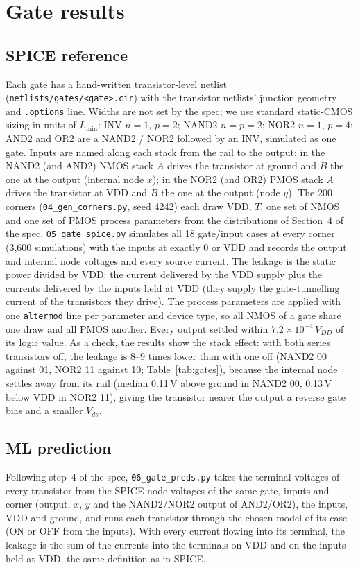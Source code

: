 \documentclass[11pt,a4paper]{article}
\begin{document}
\section{Gate results}\label{sec:gates}
\subsection{SPICE reference}
Each gate has a hand-written transistor-level netlist (\texttt{netlists/gates/<gate>.cir}) with the
transistor netlists' junction geometry and \texttt{.options} line. Widths are not set by the spec;
we use standard static-CMOS sizing in units of $L_{\min}$: INV $n=1$, $p=2$; NAND2 $n=p=2$; NOR2 $n=1$,
$p=4$; AND2 and OR2 are a NAND2 / NOR2 followed by an INV, simulated as one gate. Inputs are named
along each stack from the rail to the output: in the NAND2 (and AND2) NMOS stack $A$ drives the
transistor at ground and $B$ the one at the output (internal node $x$); in the NOR2 (and OR2) PMOS
stack $A$ drives the transistor at VDD and $B$ the one at the output (node $y$).
The 200 corners (\texttt{04\_gen\_corners.py}, seed 4242) each draw VDD, $T$, one set of NMOS and one
set of PMOS process parameters from the distributions of Section~4 of the spec. \texttt{05\_gate\_spice.py}
simulates all 18 gate/input cases at every corner (3{,}600 simulations) with the inputs at exactly 0 or
VDD and records the output and internal node voltages and every source current. The leakage is the
static power divided by VDD: the current delivered by the VDD supply plus the currents delivered by the
inputs held at VDD (they supply the gate-tunnelling current of the transistors they drive). The process
parameters are applied with one \texttt{altermod} line per parameter and device type, so all NMOS of a gate
share one draw and all PMOS another. Every output settled within $7.2\times10^{-4}\,V_{DD}$ of its logic
value. As a check, the results show the stack effect: with both series transistors off, the leakage is
8--9 times lower than with one off (NAND2 00 against 01, NOR2 11 against 10; Table~\ref{tab:gates}),
because the internal node settles away from its rail (median 0.11\,V above ground in NAND2 00, 0.13\,V
below VDD in NOR2 11), giving the transistor nearer the output a reverse gate bias and a smaller $V_{ds}$.

\subsection{ML prediction}
Following step~4 of the spec, \texttt{06\_gate\_preds.py} takes the terminal voltages of every transistor
from the SPICE node voltages of the same gate, inputs and corner (output, $x$, $y$ and the NAND2/NOR2
output of AND2/OR2), the inputs, VDD and ground, and runs each transistor through the chosen model of its
case (ON or OFF from the inputs). With every current flowing into its terminal, the leakage is the sum of
the currents into the terminals on VDD and on the inputs held at VDD, the same definition as in SPICE.
\end{document}
